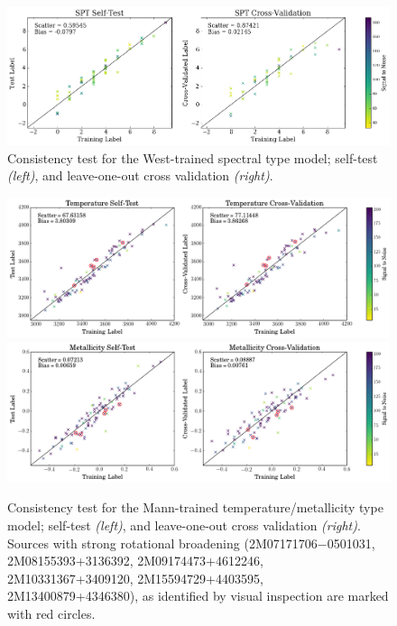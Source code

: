 \documentclass[modern]{aastex62}
\begin{document}

\newpage

\begin{figure}[ht]
\begin{center}
\includegraphics[width=15cm]{figures/self_and_validation_test_spt_snr.png}
\end{center}
\caption{Consistency test for the West-trained spectral type model; self-test \textit{(left)}, and leave-one-out cross validation \textit{(right)}.} \label{fig:west_validation}
\end{figure}

\begin{figure}[ht]
\begin{center}
\includegraphics[width=15cm]{figures/self_and_validation_test_teff_snr.png}
\includegraphics[width=15cm]{figures/self_and_validation_test_feh_snr.png}
\end{center}
\caption{Consistency test for the Mann-trained temperature/metallicity type model; self-test \textit{(left)}, and leave-one-out cross validation \textit{(right)}. Sources with strong rotational broadening (2M07171706−0501031, 2M08155393+3136392, 2M09174473+4612246, 2M10331367+3409120, 2M15594729+4403595, 2M13400879+4346380), as identified by visual inspection are marked with red circles.} \label{fig:mann_validation}
\end{figure}
\end{document}
